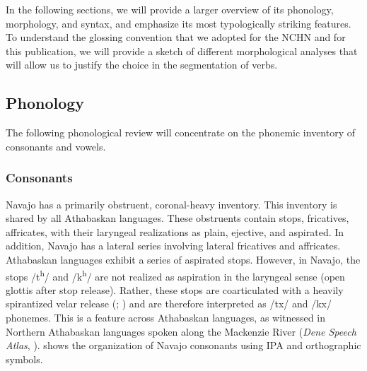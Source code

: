 In the following sections, we will provide a larger overview of its phonology, morphology, and syntax, and emphasize its most typologically striking features. To understand the glossing convention that we adopted for the NCHN and for this publication, we will provide a sketch of different morphological analyses that will allow us to justify the choice in the segmentation of verbs.

\subsection{Phonology}

The following phonological review will concentrate on the phonemic inventory of consonants and vowels.

\subsubsection{Consonants}

Navajo has a primarily obstruent, coronal-heavy inventory. This inventory is shared by all Athabaskan languages. These obstruents contain stops, fricatives, affricates, with their laryngeal realizations as plain, ejective, and aspirated. In addition, Navajo has a lateral series involving lateral fricatives and affricates. Athabaskan languages exhibit a series of aspirated stops. However, in Navajo, the stops /t\textsuperscript{h}/ and /k\textsuperscript{h}/ are not realized as aspiration in the laryngeal sense (open glottis after stop release). Rather, these stops are coarticulated with a heavily spirantized velar release (\cite{McDonough:2008gh}; \cite{Iskarous:2012qz}) and are therefore interpreted as /tx/ and /kx/ phonemes. This is a feature across Athabaskan languages, as witnessed in Northern Athabaskan languages spoken along the Mackenzie River (\textit{Dene Speech Atlas}, \cite{McDonough:2013fk}).  shows the organization of Navajo consonants using IPA and orthographic symbols.

